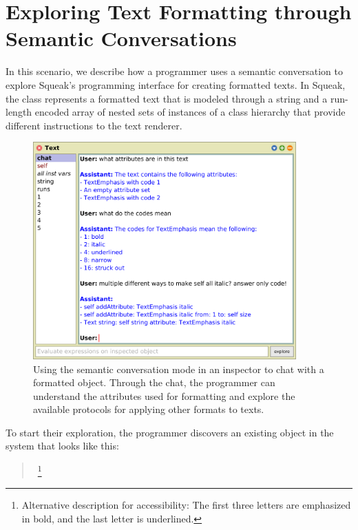 
\section{Exploring Text Formatting through Semantic Conversations}
\label{sec:application/conversation}

In this scenario, we describe how a programmer uses a semantic conversation to explore Squeak's programming interface for creating formatted texts.
In Squeak, the  class represents a formatted text that is modeled through a string and a run-length encoded array of nested sets of instances of a  class hierarchy that provide different instructions to the text renderer.

\FloatBarrier
\begin{figure}[t]
	\centering
	\includegraphics[width=0.9\textwidth]{chapters/08_application/02_conversation/text.png}
	\caption[Using the semantic conversation mode in an inspector to chat with a formatted  object.]{
		Using the semantic conversation mode in an inspector to chat with a formatted  object.
		Through the chat, the programmer can understand the attributes used for formatting and explore the available protocols for applying other formats to texts.
	}
	\label{fig:application/conversation/text}
\end{figure}

To start their exploration, the programmer discovers an existing  object in the system that looks like this:

\begin{quote}
	\,%
	\footnote{Alternative description for accessibility: The first three letters are emphasized in bold, and the last letter is underlined.}
\end{quote}

